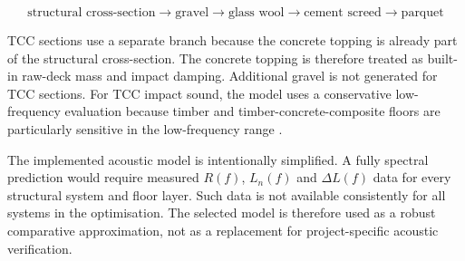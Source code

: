 \[
    \text{structural cross-section}
    \rightarrow
    \text{gravel}
    \rightarrow
    \text{glass wool}
    \rightarrow
    \text{cement screed}
    \rightarrow
    \text{parquet}
\]

\noindent TCC sections use a separate branch because the concrete topping is already part of the structural cross-section. The concrete topping is therefore treated as built-in raw-deck mass and impact damping. Additional gravel is not generated for TCC sections. For TCC impact sound, the model uses a conservative low-frequency evaluation because timber and timber-concrete-composite floors are particularly sensitive in the low-frequency range \cite{BauphysikKalender}.

\noindent The implemented acoustic model is intentionally simplified. A fully spectral prediction would require measured $R(f)$, $L_n(f)$ and $\Delta L(f)$ data for every structural system and floor layer. Such data is not available consistently for all systems in the optimisation. The selected model is therefore used as a robust comparative approximation, not as a replacement for project-specific acoustic verification.
